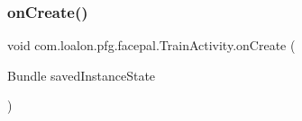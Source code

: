 \subsubsection{\texorpdfstring{on\+Create()}{onCreate()}}
{\footnotesize\ttfamily void com.\+loalon.\+pfg.\+facepal.\+Train\+Activity.\+on\+Create (\begin{DoxyParamCaption}\item[{Bundle}]{saved\+Instance\+State }\end{DoxyParamCaption})\hspace{0.3cm}{\ttfamily [protected]}}

